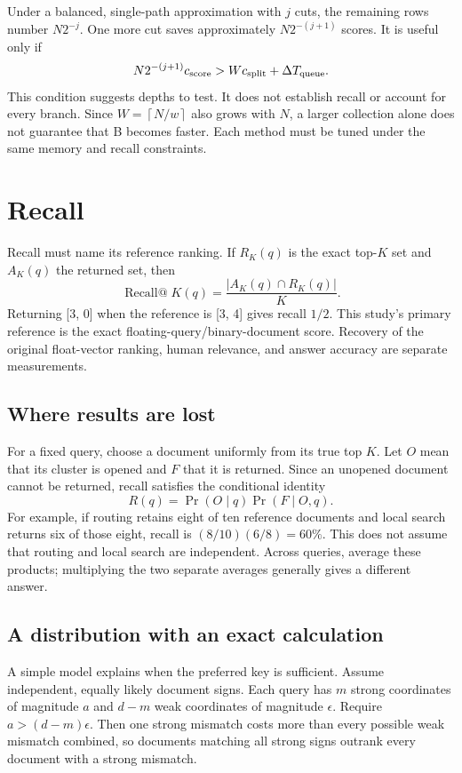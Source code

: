 \documentclass[11pt,a4paper]{article}
\newcommand{\ceil}[1]{\left\lceil #1\right\rceil}
\begin{document}
Under a balanced, single-path approximation with $j$ cuts, the remaining rows number
$N2^{-j}$. One more cut saves approximately $N2^{-(j+1)}$ scores. It is useful only if
\begin{equation}
 N2^{-(j+1)}c_{\rm score}>Wc_{\rm split}+\Delta T_{\rm queue}.
 \label{eq:split}
\end{equation}
This condition suggests depths to test. It does not establish recall or account for every
branch. Since $W=\ceil{N/w}$ also grows with $N$, a larger collection alone does not guarantee
that B becomes faster. Each method must be tuned under the same memory and recall constraints.

\newpage
\section{Recall}
Recall must name its reference ranking. If $R_K(q)$ is the exact top-$K$ set and $A_K(q)$
the returned set, then
\begin{equation}
 \operatorname{Recall@}K(q)=\frac{|A_K(q)\cap R_K(q)|}{K}.
\end{equation}
Returning [3, 0] when the reference is [3, 4] gives recall $1/2$. This study's primary
reference is the exact floating-query/binary-document score. Recovery of the original
float-vector ranking, human relevance, and answer accuracy are separate measurements.

\subsection{Where results are lost}
For a fixed query, choose a document uniformly from its true top $K$. Let $O$ mean that
its cluster is opened and $F$ that it is returned. Since an unopened document cannot be
returned, recall satisfies the conditional identity
\begin{equation}
 R(q)=\Pr(O\mid q)\Pr(F\mid O,q).
\end{equation}
For example, if routing retains eight of ten reference documents and local search returns
six of those eight, recall is $(8/10)(6/8)=60\%$. This does not assume that routing and local
search are independent. Across queries, average these products; multiplying the two separate
averages generally gives a different answer.

\subsection{A distribution with an exact calculation}
A simple model explains when the preferred key is sufficient. Assume independent, equally
likely document signs. Each query has $m$ strong coordinates of magnitude $a$ and $d-m$
weak coordinates of magnitude $\epsilon$. Require $a>(d-m)\epsilon$. Then one strong mismatch
costs more than every possible weak mismatch combined, so documents matching all strong
signs outrank every document with a strong mismatch.
\end{document}
